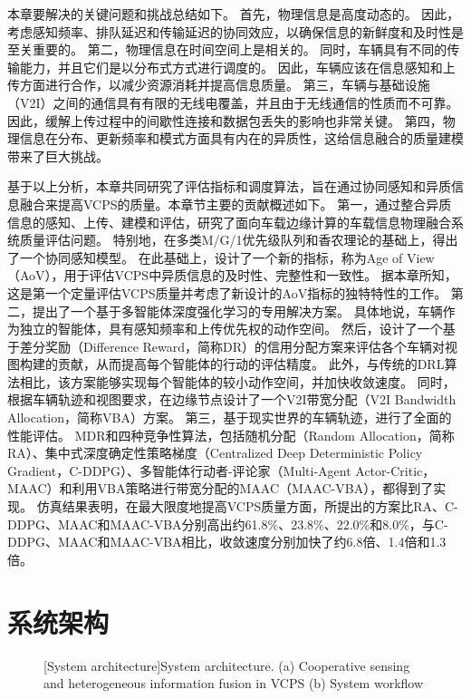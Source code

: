 本章要解决的关键问题和挑战总结如下。
首先，物理信息是高度动态的。
因此，考虑感知频率、排队延迟和传输延迟的协同效应，以确保信息的新鲜度和及时性是至关重要的。
第二，物理信息在时间空间上是相关的。
同时，车辆具有不同的传输能力，并且它们是以分布式方式进行调度的。
因此，车辆应该在信息感知和上传方面进行合作，以减少资源消耗并提高信息质量。
第三，车辆与基础设施（V2I）之间的通信具有有限的无线电覆盖，并且由于无线通信的性质而不可靠。
因此，缓解上传过程中的间歇性连接和数据包丢失的影响也非常关键。
第四，物理信息在分布、更新频率和模式方面具有内在的异质性，这给信息融合的质量建模带来了巨大挑战。

基于以上分析，本章共同研究了评估指标和调度算法，旨在通过协同感知和异质信息融合来提高VCPS的质量。本章节主要的贡献概述如下。
第一，通过整合异质信息的感知、上传、建模和评估，研究了面向车载边缘计算的车载信息物理融合系统质量评估问题。
特别地，在多类M/G/1优先级队列和香农理论的基础上，得出了一个协同感知模型。
在此基础上，设计了一个新的指标，称为Age of View（AoV），用于评估VCPS中异质信息的及时性、完整性和一致性。
据本章所知，这是第一个定量评估VCPS质量并考虑了新设计的AoV指标的独特特性的工作。
第二，提出了一个基于多智能体深度强化学习的专用解决方案。
具体地说，车辆作为独立的智能体，具有感知频率和上传优先权的动作空间。
然后，设计了一个基于差分奖励（Difference Reward，简称DR）的信用分配方案来评估各个车辆对视图构建的贡献，从而提高每个智能体的行动的评估精度。
此外，与传统的DRL算法相比，该方案能够实现每个智能体的较小动作空间，并加快收敛速度。
同时，根据车辆轨迹和视图要求，在边缘节点设计了一个V2I带宽分配（V2I Bandwidth Allocation，简称VBA）方案。
第三，基于现实世界的车辆轨迹，进行了全面的性能评估。
MDR和四种竞争性算法，包括随机分配（Random Allocation，简称RA）、集中式深度确定性策略梯度（Centralized Deep Deterministic Policy Gradient，C-DDPG）\cite{mlika2022deep}、多智能体行动者-评论家（Multi-Agent Actor-Critic，MAAC）\cite{he2021efficient}和利用VBA策略进行带宽分配的MAAC（MAAC-VBA），都得到了实现。
仿真结果表明，在最大限度地提高VCPS质量方面，所提出的方案比RA、C-DDPG、MAAC和MAAC-VBA分别高出约61.8\%、23.8\%、22.0\%和8.0\%，与C-DDPG、MAAC和MAAC-VBA相比，收敛速度分别加快了约6.8倍、1.4倍和1.3倍。

\section{系统架构}\label{section 3-2}


\begin{figure}[h]
     \centering
     [System architecture]{System architecture. (a) Cooperative sensing and heterogeneous information fusion in VCPS (b) System workflow}
     \label{fig 3-1}
\end{figure}

